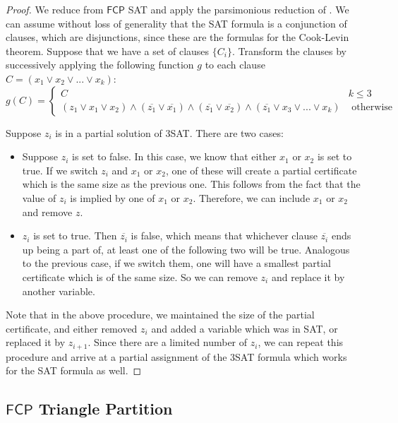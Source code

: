 \documentclass[runningheads,a4paper]{llncs}
\begin{document}
\begin{proof}
We reduce from $\mathsf{FCP}$ SAT and apply the parsimonious reduction of \cite{yaleclass}. We can assume without loss of generality that the SAT formula is a conjunction of clauses, which are disjunctions, since these are the formulas for the Cook-Levin theorem. Suppose that we have a set of clauses $\{ C_i \}$. Transform the clauses by successively applying the following function $g$ to each clause $C = (x_1 \vee x_2 \vee ... \vee x_k)$:
\[ g(C) = \left\{ \begin{array}{cc} C & k \leq 3 \\
						    (z_1 \vee x_1 \vee x_2) \wedge (\overline{z_1} \vee \overline{x_1}) \wedge (\overline{z_1} \vee \overline{x_2}) \wedge (\overline{z_1} \vee x_3 \vee ... \vee x_k) & \text{ otherwise }\end{array} \right. \] 

Suppose $z_i$ is in a partial solution of 3SAT. There are two cases:
\begin{itemize}
\item Suppose $z_i$ is set to false. In this case, we know that either $x_1$ or $x_2$ is set to true. If we switch $z_i$ and $x_1$ or $x_2$, one of these will create a partial certificate which is the same size as the previous one. This follows from the fact that the value of $z_i$ is implied by one of $x_1$ or $x_2$. Therefore, we can include $x_1$ or $x_2$ and remove $z$.
\item $z_i$ is set to true. Then $\overline{z_i}$ is false, which means that whichever clause $\overline{z_i}$ ends up being a part of, at least one of the following two will be true. Analogous to the previous case, if we switch them, one will have a smallest partial certificate which is of the same size. So we can remove $z_i$ and replace it by another variable. 
\end{itemize}
Note that in the above procedure, we maintained the size of the partial certificate, and either removed $z_i$ and added a variable which was in SAT, or replaced it by $z_{i+1}$. Since there are a limited number of $z_i$, we can repeat this procedure and arrive at a partial assignment of the 3SAT formula which works for the SAT formula as well.
\end{proof}

\subsection{$\mathsf{FCP}$ Triangle Partition}
\end{document}
